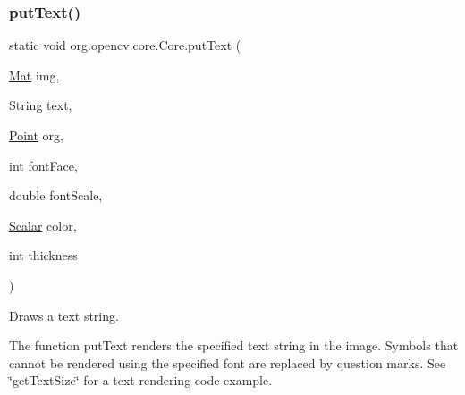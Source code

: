 \subsubsection{\texorpdfstring{put\+Text()}{putText()}\hspace{0.1cm}{\footnotesize\ttfamily [2/3]}}
{\footnotesize\ttfamily static void org.\+opencv.\+core.\+Core.\+put\+Text (\begin{DoxyParamCaption}\item[{\mbox{\hyperlink{classorg_1_1opencv_1_1core_1_1_mat}{Mat}}}]{img,  }\item[{String}]{text,  }\item[{\mbox{\hyperlink{classorg_1_1opencv_1_1core_1_1_point}{Point}}}]{org,  }\item[{int}]{font\+Face,  }\item[{double}]{font\+Scale,  }\item[{\mbox{\hyperlink{classorg_1_1opencv_1_1core_1_1_scalar}{Scalar}}}]{color,  }\item[{int}]{thickness }\end{DoxyParamCaption})\hspace{0.3cm}{\ttfamily [static]}}

Draws a text string.

The function {\ttfamily put\+Text} renders the specified text string in the image. Symbols that cannot be rendered using the specified font are replaced by question marks. See \char`\"{}get\+Text\+Size\char`\"{} for a text rendering code example.


